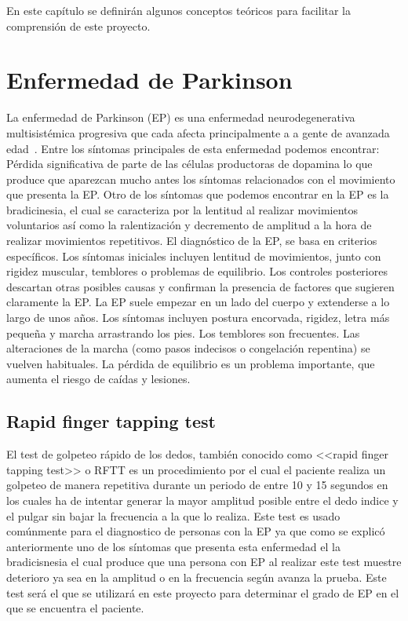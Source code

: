 
En este capítulo se definirán algunos conceptos teóricos para facilitar la comprensión de este proyecto.

\section{Enfermedad de Parkinson}

La enfermedad de Parkinson (EP) es una  enfermedad neurodegenerativa multisistémica progresiva que cada afecta principalmente a a gente de avanzada edad~\cite{pdsymptoms}. 
Entre los síntomas principales de esta enfermedad podemos encontrar:
Pérdida significativa de parte de las células productoras de dopamina lo que produce que aparezcan mucho antes los síntomas relacionados con el movimiento que presenta la EP. Otro de los síntomas que podemos encontrar en la EP es la bradicinesia, el cual se caracteriza por la lentitud al realizar movimientos voluntarios así como la ralentización y decremento de amplitud a la hora de realizar movimientos repetitivos.
El diagnóstico de la EP, se basa en criterios específicos. Los síntomas iniciales incluyen lentitud de movimientos, junto con rigidez muscular, temblores o problemas de equilibrio. Los controles posteriores descartan otras posibles causas y confirman la presencia de factores que sugieren claramente la EP.
La EP suele empezar en un lado del cuerpo y extenderse a lo largo de unos años. Los síntomas incluyen postura encorvada, rigidez, letra más pequeña y marcha arrastrando los pies. Los temblores son frecuentes.
Las alteraciones de la marcha (como pasos indecisos o congelación repentina) se vuelven habituales. La pérdida de equilibrio es un problema importante, que aumenta el riesgo de caídas y lesiones.

\subsection{Rapid finger tapping test}

El test de golpeteo rápido de los dedos, también conocido como <<rapid finger tapping test>> o RFTT es un procedimiento por el cual el paciente realiza un golpeteo de manera repetitiva durante un periodo de entre 10 y 15 segundos en los cuales ha de intentar generar la mayor amplitud posible entre el dedo indice y el pulgar sin bajar la frecuencia a la que lo realiza. Este test es usado comúnmente para el diagnostico de personas con la EP ya que como se explicó anteriormente uno de los síntomas que presenta esta enfermedad el la bradicisnesia el cual produce que una persona con EP al realizar este test muestre deterioro ya sea en la amplitud o en la frecuencia según avanza la prueba. Este test será el que se utilizará en este proyecto para determinar el grado de EP en el que se encuentra el paciente.


